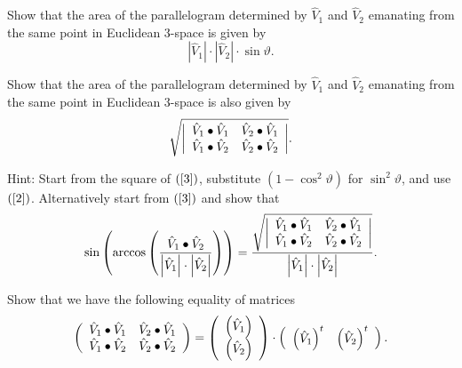 \begin{exercise}
Show that the area of the parallelogram determined by $\hat{V}_{1}$ and
$\hat{V}_{2}$ emanating from the same point in Euclidean $3$-space is given by%
\begin{equation}
\left\vert \hat{V}_{1}\right\vert \cdot\left\vert \hat{V}_{2}\right\vert
\cdot\sin\vartheta. \label{3}%
\end{equation}

\end{exercise}

\begin{exercise}
\label{9}Show that the area of the parallelogram determined by $\hat{V}_{1}$
and $\hat{V}_{2}$ emanating from the same point in Euclidean $3$-space is also
given by%
\[
\sqrt{\left\vert
\begin{array}
[c]{cc}%
\hat{V}_{1}\bullet\hat{V}_{1} & \hat{V}_{2}\bullet\hat{V}_{1}\\
\hat{V}_{1}\bullet\hat{V}_{2} & \hat{V}_{2}\bullet\hat{V}_{2}%
\end{array}
\right\vert }.
\]


Hint: Start from the square of $\left(  \ref{3}\right)  $, substitute $\left(
1-\cos^{2}\vartheta\right)  $ for $\sin^{2}\vartheta$, and use
$\left(  \ref{2}\right)  $. Alternatively start from $\left(  \ref{3}\right)
$ and show that%
\[
\sin\left(  \arccos\left(  \frac{\hat{V}_{1}\bullet\hat{V}%
_{2}}{\left\vert \hat{V}_{1}\right\vert \cdot\left\vert \hat{V}_{2}\right\vert
}\right)  \right)  =\frac{\sqrt{\left\vert
\begin{array}
[c]{cc}%
\hat{V}_{1}\bullet\hat{V}_{1} & \hat{V}_{2}\bullet\hat{V}_{1}\\
\hat{V}_{1}\bullet\hat{V}_{2} & \hat{V}_{2}\bullet\hat{V}_{2}%
\end{array}
\right\vert }}{\left\vert \hat{V}_{1}\right\vert \cdot\left\vert \hat{V}%
_{2}\right\vert }.
\]

\end{exercise}

\begin{exercise}
Show that we have the following equality of matrices%
\[
\left(
\begin{array}
[c]{cc}%
\hat{V}_{1}\bullet\hat{V}_{1} & \hat{V}_{2}\bullet\hat{V}_{1}\\
\hat{V}_{1}\bullet\hat{V}_{2} & \hat{V}_{2}\bullet\hat{V}_{2}%
\end{array}
\right)  =\left(
\begin{array}
[c]{c}%
\left(  \hat{V}_{1}\right) \\
\left(  \hat{V}_{2}\right)
\end{array}
\right)  \cdot\left(
\begin{array}
[c]{cc}%
\left(  \hat{V}_{1}\right)  ^{t} & \left(  \hat{V}_{2}\right)  ^{t}%
\end{array}
\right)  .
\]

\end{exercise}

